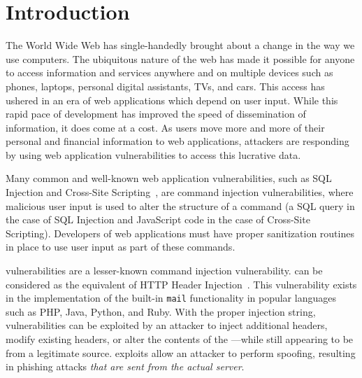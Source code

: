 \section{Introduction}
The World Wide Web has single-handedly brought about a change in the way we use computers. The ubiquitous nature of the web has made it possible for anyone to access information and services anywhere and on multiple devices such as phones, laptops, personal digital assistants, TVs, and cars. This access has ushered in an era of web applications which depend on user input. While this rapid pace of development has improved the speed of dissemination of information, it does come at a cost. As users move more and more of their personal and financial information to web applications, attackers are responding by using web application vulnerabilities to access this lucrative data.


Many common and well-known web application vulnerabilities, such as SQL Injection and Cross-Site Scripting~\cite{OWASPT10}, are command injection vulnerabilities, where malicious user input is used to alter the structure of a command (a SQL query in the case of SQL Injection and JavaScript code in the case of Cross-Site Scripting). Developers of web applications must have proper sanitization routines in place to use user input as part of these commands. 

\ehi vulnerabilities are a lesser-known command injection vulnerability. \ehi can be considered as the \email equivalent of HTTP Header Injection~\cite{wiki:HTTP_headerinjection}. This vulnerability exists in the implementation of the built-in \texttt{mail} functionality in popular languages such as PHP, Java, Python, and Ruby. With the proper injection string, \ehi vulnerabilities can be exploited by an attacker to inject additional headers, modify existing headers, or alter the contents of the \email---while still appearing to be from a legitimate source. \ehi exploits allow an attacker to perform \email spoofing, resulting in phishing attacks \emph{that are sent from the actual \email server}.

